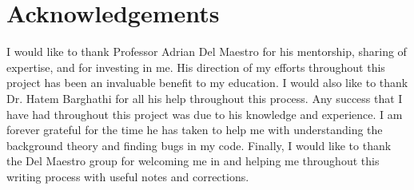 \chapter*{Acknowledgements}
I would like to thank Professor Adrian Del Maestro for his mentorship, sharing of expertise, and for investing in me. His direction of my efforts throughout this project has been an invaluable benefit to my education.  I would also like to thank Dr. Hatem Barghathi for all his help throughout this process. Any success that I have had throughout this project was due to his knowledge and experience. I am forever grateful for the time he has taken to help me with understanding the background theory and finding bugs in my code. Finally, I would like to thank the Del Maestro group for welcoming me in and helping me throughout this writing process with useful notes and corrections. 